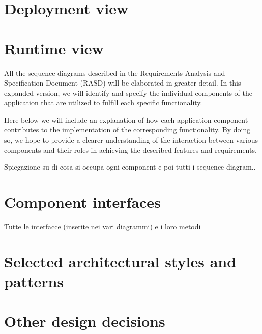 \section{Deployment view}

\section{Runtime view}

All the sequence diagrams described in the Requirements Analysis and Specification Document (RASD) will be elaborated in greater detail. In this expanded version, we will identify and specify the individual components of the application that are utilized to fulfill each specific functionality. 

Here below we will include an explanation of how each application component contributes to the implementation of the corresponding functionality. By doing so, we hope to provide a clearer understanding of the interaction between various components and their roles in achieving the described features and requirements.

Spiegazione su di cosa si occupa ogni component e poi tutti i sequence diagram..

\section{Component interfaces}
Tutte le interfacce (inserite nei vari diagrammi) e i loro metodi

\section{Selected architectural styles and patterns}
\section{Other design decisions }
